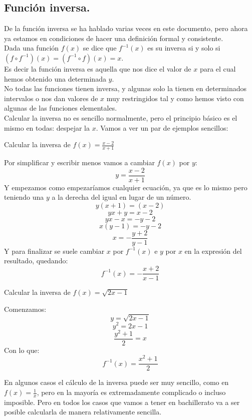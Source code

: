 \documentclass[a4paper,11pt,answers]{exam}
\begin{document}
\begin{center}
\end{center}
\subsection{Función inversa.}
De la función inversa se ha hablado varias veces en este documento, pero ahora ya estamos en condiciones de hacer una definición formal y consistente.\\

Dada una función $f(x)$ se dice que $f^{-1}(x)$ es su inversa si y solo si $(f \circ f^{-1})(x) = (f^{-1} \circ f) (x) = x$.\\
Es decir la función inversa es aquella que nos dice el valor de $x$ para el cual hemos obtenido una determinada $y$.\\

No todas las funciones tienen inversa, y algunas solo la tienen en determinados intervalos o nos dan valores de $x$ muy restringidos tal y como hemos visto con algunas de las funciones elementales.\\

Calcular la inversa no es sencillo normalmente, pero el principio básico es el mismo en todas: despejar la $x$. Vamos a ver un par de ejemplos sencillos:\\
\begin{questions}
\question Calcular la inversa de $f(x) = \frac{x-2}{x+1}$
\begin{solution}
Por simplificar y escribir menos vamos a cambiar $f(x)$ por $y$:
\[y = \frac{x-2}{x+1}\]
Y empezamos como empezaríamos cualquier ecuación, ya que es lo mismo pero teniendo una $y$ a la derecha del igual en lugar de un número.
\[y(x+1) = (x-2)\]
\[yx + y = x- 2\]
\[yx - x = -y - 2\]
\[x(y-1) = -y - 2\]
\[x = -\frac{y+2}{y-1}\]
Y para finalizar se suele cambiar $x$ por $f^{-1}(x)$ e $y$ por $x$ en la expresión del resultado, quedando:
\[f^{-1}(x) = -\frac{x+2}{x-1}\]
\end{solution}

\question Calcular la inversa de $f(x) = \sqrt{2x - 1}$
\begin{solution}
Comenzamos:
\[y = \sqrt{2x -1}\]
\[y^2 = 2x - 1\]
\[\frac{y^2 +1}{2} = x\]
Con lo que:
\[f^{-1}(x) = \frac{x^2 +1}{2}\]
\end{solution}
\end{questions}

En algunos casos el cálculo de la inversa puede ser muy sencillo, como en $f(x) = \frac{1}{x}$, pero en la mayoría es extremadamente complicado o incluso imposible. Pero en todos los casos que vamos a tener en bachillerato va a ser posible calcularla de manera relativamente sencilla.
\end{document}
